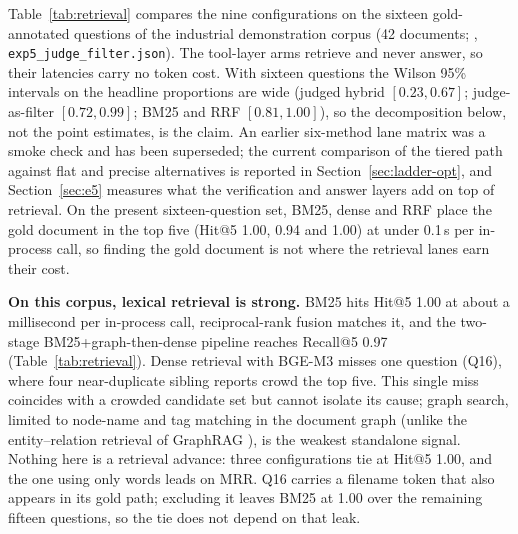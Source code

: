 Table~\ref{tab:retrieval} compares the nine configurations on the sixteen
gold-annotated questions of the industrial demonstration corpus (42 documents;
,
\texttt{exp5\_judge\_filter.json}). The tool-layer arms retrieve and never
answer, so their latencies carry no token cost. With sixteen questions the
Wilson 95\% intervals on the headline proportions are wide (judged hybrid
$[0.23, 0.67]$; judge-as-filter $[0.72, 0.99]$; BM25 and RRF
$[0.81, 1.00]$), so the decomposition below, not the point estimates, is
the claim. An earlier six-method lane matrix was a smoke check and has
been superseded; the current comparison of the tiered path against flat and
precise alternatives is reported in Section~\ref{sec:ladder-opt}, and
Section~\ref{sec:e5} measures what the verification and answer layers add on
top of retrieval. On the present sixteen-question set, BM25, dense and RRF
place the gold document in the top five (Hit@5 1.00, 0.94 and 1.00) at under
0.1\,s per in-process call, so finding the gold document is not where the
retrieval lanes earn their cost.

\textbf{On this corpus, lexical retrieval is strong.} BM25 \cite{bm25}
hits Hit@5 1.00 at about a millisecond per in-process call, reciprocal-rank
fusion \cite{rrf-cormack} matches it, and the two-stage BM25+graph-then-dense
pipeline reaches Recall@5 0.97 (Table~\ref{tab:retrieval}). Dense
retrieval with BGE-M3 \cite{bge-m3} misses one question (Q16), where four
near-duplicate sibling reports crowd the top five. This single miss coincides
with a crowded candidate set but cannot isolate its cause; graph search,
limited to node-name and tag matching in the document graph (unlike the
entity--relation retrieval of GraphRAG \cite{graphrag}), is the weakest
standalone signal. Nothing here
is a retrieval advance: three configurations tie at Hit@5 1.00, and the one
using only words leads on MRR. Q16 carries a filename token that also appears
in its gold path; excluding it leaves BM25 at 1.00 over the remaining fifteen
questions, so the tie does not depend on that leak.

